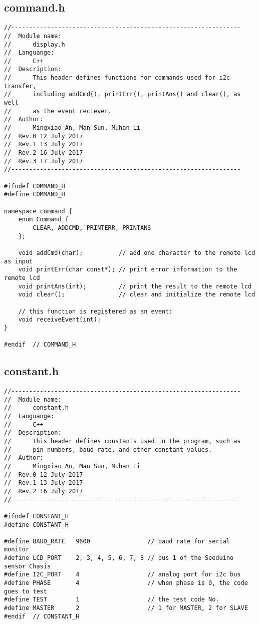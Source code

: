 \subsection{command.h}
\begin{verbatim}
//----------------------------------------------------------------
//  Module name:
//      display.h
//  Languange:
//      C++
//  Description:
//      This header defines functions for commands used for i2c transfer,
//      including addCmd(), printErr(), printAns() and clear(), as well
//      as the event reciever.
//  Author:
//      Mingxiao An, Man Sun, Muhan Li
//  Rev.0 12 July 2017
//  Rev.1 13 July 2017
//  Rev.2 16 July 2017
//  Rev.3 17 July 2017
//----------------------------------------------------------------

#ifndef COMMAND_H
#define COMMAND_H

namespace command {
    enum Command {
        CLEAR, ADDCMD, PRINTERR, PRINTANS
    };

    void addCmd(char);          // add one character to the remote lcd as input 
    void printErr(char const*); // print error information to the remote lcd
    void printAns(int);         // print the result to the remote lcd 
    void clear();               // clear and initialize the remote lcd

    // this function is registered as an event:
    void receiveEvent(int);
}

#endif  // COMMAND_H

\end{verbatim}
\subsection{constant.h}
\begin{verbatim}
//----------------------------------------------------------------
//  Module name:
//      constant.h
//  Languange:
//      C++
//  Description:
//      This header defines constants used in the program, such as
//      pin numbers, baud rate, and other constant values.
//  Author:
//      Mingxiao An, Man Sun, Muhan Li
//  Rev.0 12 July 2017
//  Rev.1 13 July 2017
//  Rev.2 16 July 2017
//----------------------------------------------------------------

#ifndef CONSTANT_H
#define CONSTANT_H

#define BAUD_RATE   9600                // baud rate for serial monitor
#define LCD_PORT    2, 3, 4, 5, 6, 7, 8 // bus 1 of the Seeduino sensor Chasis
#define I2C_PORT    4                   // analog port for i2c bus
#define PHASE       4                   // when phase is 0, the code goes to test
#define TEST        1                   // the test code No.
#define MASTER      2                   // 1 for MASTER, 2 for SLAVE
#endif  // CONSTANT_H

\end{verbatim}

